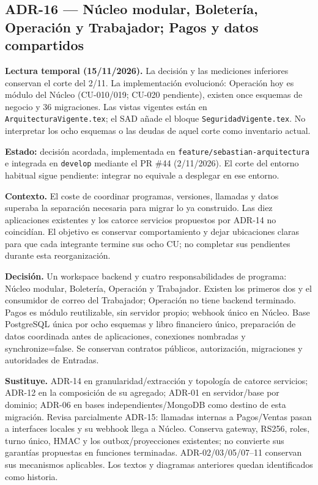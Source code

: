 \subsection*{ADR-16 --- Núcleo modular, Boletería, Operación y Trabajador; Pagos y datos compartidos}
\textbf{Lectura temporal (15/11/2026).} La decisión y las mediciones inferiores
conservan el corte del 2/11. La implementación evolucionó: Operación hoy es
módulo del Núcleo (CU-010/019; CU-020 pendiente), existen once esquemas de negocio
y 36 migraciones. Las vistas vigentes están en \texttt{ArquitecturaVigente.tex};
el SAD añade el bloque \texttt{SeguridadVigente.tex}.
No interpretar los ocho esquemas o las deudas de aquel corte como inventario actual.

\textbf{Estado:} decisión acordada, implementada en
\texttt{feature/}\allowbreak\texttt{sebastian-arquitectura} e integrada en \texttt{develop}
mediante el PR \#44 (2/11/2026). El corte del entorno habitual sigue pendiente: integrar
no equivale a desplegar en ese entorno.

\textbf{Contexto.} El coste de coordinar programas, versiones, llamadas y datos
superaba la separación necesaria para migrar lo ya construido. Las diez aplicaciones
existentes y los catorce servicios propuestos por ADR-14 no coincidían. El objetivo
es conservar comportamiento y dejar ubicaciones claras para que cada integrante
termine sus ocho CU; no completar sus pendientes durante esta reorganización.

\textbf{Decisión.} Un workspace backend y cuatro responsabilidades de programa:
Núcleo modular, Boletería, Operación y Trabajador. Existen los primeros dos y el
consumidor de correo del Trabajador; Operación no tiene backend terminado. Pagos
es módulo reutilizable, sin servidor propio; webhook único en Núcleo. Base
PostgreSQL única por ocho esquemas y libro financiero único, preparación de datos
coordinada antes de aplicaciones, conexiones nombradas y synchronize=false.
Se conservan contratos públicos, autorización, migraciones y autoridades de Entradas.

\textbf{Sustituye.} ADR-14 en granularidad/extracción y topología de catorce
servicios; ADR-12 en la composición de su agregado; ADR-01 en servidor/base por
dominio; ADR-06 en bases independientes/MongoDB como destino de esta migración.
Revisa parcialmente ADR-15: llamadas internas a Pagos/Ventas pasan a interfaces
locales y su webhook llega a Núcleo. Conserva gateway, RS256, roles, turno único,
HMAC y los outbox/proyecciones existentes; no convierte sus garantías propuestas
en funciones terminadas. ADR-02/03/05/07--11 conservan sus mecanismos aplicables.
Los textos y diagramas anteriores quedan identificados como historia.


